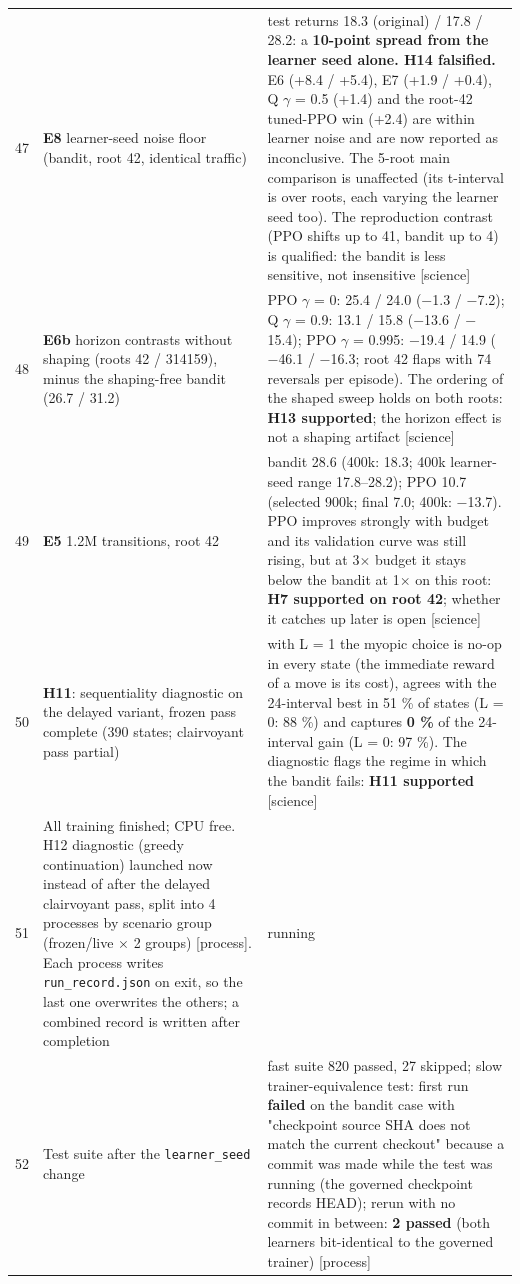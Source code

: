 {\begin{longtable}{@{}rp{}p{}@{}}
47 & \textbf{E8} learner-seed noise floor (bandit, root 42, identical traffic) & test returns 18.3 (original) / 17.8 / 28.2: a \textbf{10-point spread from the learner seed alone. H14 falsified.} E6 (+8.4 / +5.4), E7 (+1.9 / +0.4), Q $\gamma$ = 0.5 (+1.4) and the root-42 tuned-PPO win (+2.4) are within learner noise and are now reported as inconclusive. The 5-root main comparison is unaffected (its t-interval is over roots, each varying the learner seed too). The reproduction contrast (PPO shifts up to 41, bandit up to 4) is qualified: the bandit is less sensitive, not insensitive [science] \\
48 & \textbf{E6b} horizon contrasts without shaping (roots 42 / 314159), minus the shaping-free bandit (26.7 / 31.2) & PPO $\gamma$ = 0: 25.4 / 24.0 ($-$1.3 / $-$7.2); Q $\gamma$ = 0.9: 13.1 / 15.8 ($-$13.6 / $-$15.4); PPO $\gamma$ = 0.995: $-$19.4 / 14.9 ($-$46.1 / $-$16.3; root 42 flaps with 74 reversals per episode). The ordering of the shaped sweep holds on both roots: \textbf{H13 supported}; the horizon effect is not a shaping artifact [science] \\
49 & \textbf{E5} 1.2M transitions, root 42 & bandit 28.6 (400k: 18.3; 400k learner-seed range 17.8--28.2); PPO 10.7 (selected 900k; final 7.0; 400k: $-$13.7). PPO improves strongly with budget and its validation curve was still rising, but at 3$\times$ budget it stays below the bandit at 1$\times$ on this root: \textbf{H7 supported on root 42}; whether it catches up later is open [science] \\
50 & \textbf{H11}: sequentiality diagnostic on the delayed variant, frozen pass complete (390 states; clairvoyant pass partial) & with L = 1 the myopic choice is no-op in every state (the immediate reward of a move is its cost), agrees with the 24-interval best in 51 \% of states (L = 0: 88 \%) and captures \textbf{0 \%} of the 24-interval gain (L = 0: 97 \%). The diagnostic flags the regime in which the bandit fails: \textbf{H11 supported} [science] \\
51 & All training finished; CPU free. H12 diagnostic (greedy continuation) launched now instead of after the delayed clairvoyant pass, split into 4 processes by scenario group (frozen/live $\times$ 2 groups) [process]. Each process writes \texttt{run\_\allowbreak{}record.\allowbreak{}json} on exit, so the last one overwrites the others; a combined record is written after completion & running \\
52 & Test suite after the \texttt{learner\_\allowbreak{}seed} change & fast suite 820 passed, 27 skipped; slow trainer-equivalence test: first run \textbf{failed} on the bandit case with "checkpoint source SHA does not match the current checkout" because a commit was made while the test was running (the governed checkpoint records HEAD); rerun with no commit in between: \textbf{2 passed} (both learners bit-identical to the governed trainer) [process] \\

\end{longtable}}
